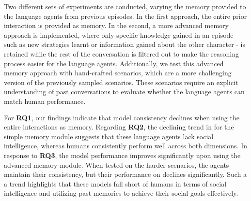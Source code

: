 Two different sets of experiments are conducted, varying the memory provided to the language agents from previous episodes. In the first approach, the entire prior interaction is provided as memory. In the second, a more advanced memory approach is implemented, where only specific knowledge gained in an episode — such as new strategies learnt or information gained about the other character - is retained while the rest of the conversation is filtered out to make the reasoning process easier for the language agents. Additionally, we test this advanced memory approach with hand-crafted scenarios, which are a more challenging version of the previously sampled scenarios. These scenarios require an explicit understanding of past conversations to evaluate whether the language agents can match human performance.

For \textbf{RQ1}, our findings indicate that model consistency declines when using the entire interactions as memory. Regarding \textbf{RQ2}, the declining trend in \goalcompletion for the simple memory module suggests that these language agents lack social intelligence, whereas humans consistently perform well across both dimensions. In response to \textbf{RQ3}, the model performance improves significantly upon using the advanced memory module. When tested on the harder scenarios, the agents maintain their consistency, but their performance on \goalcompletion declines significantly. Such a a trend highlights that these models fall short of humans in terms of social intelligence and utilizing past memories to achieve their social goals effectively.
